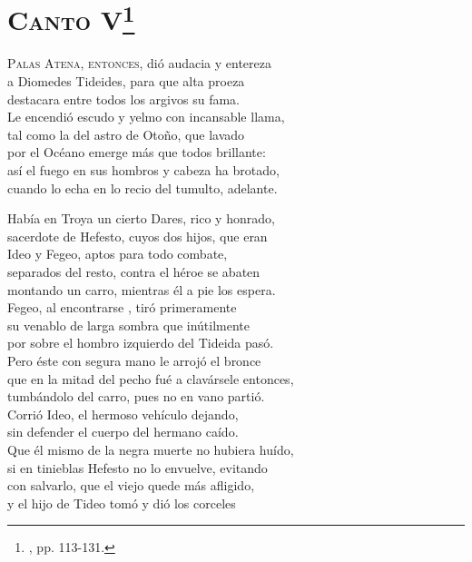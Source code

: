 \section*{\centering\textbf{\textsc{Canto} V}\footnote{\ehdos, pp. 113-131.}}
%
\beginnumbering
\pstart
{}
\lettrine[lines=4,nindent=2pt]{P}{\textsc{alas Atena, entonces}}, dió audacia y entereza\\
a Diomedes Tideides, para que alta proeza\\
destacara entre todos los argivos su fama.\\
Le encendió escudo y yelmo con incansable llama,\\
tal como la del astro de Otoño, que lavado\\
por el Océano emerge más que todos brillante:\\
así el fuego en sus hombros y cabeza ha brotado,\\
cuando lo echa en lo recio del tumulto, adelante.\par
Había en Troya un cierto Dares, rico y honrado,\\
sacerdote de Hefesto, cuyos dos hijos, que eran\\
Ideo y Fegeo, aptos para todo combate,\\
separados del resto, contra el héroe se abaten\\
montando un carro, mientras él a pie los espera.\\
Fegeo, al encontrarse , tiró primeramente\\
su venablo de larga sombra que inútilmente\\
por sobre el hombro izquierdo del Tideida pasó.\\
Pero éste con segura mano le arrojó el bronce\\
que en la mitad del pecho fué a clavársele entonces,\\
tumbándolo del carro, pues no en vano partió.\\
Corrió Ideo, el hermoso vehículo dejando,\\
sin defender el cuerpo del hermano caído.\\
Que él mismo de la negra muerte no hubiera huído,\\
si en tinieblas Hefesto no lo envuelve, evitando\\
con salvarlo, que el viejo quede más afligido,\\
y el hijo de Tideo tomó y dió los corceles\\
